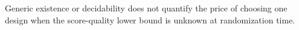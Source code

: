 Generic existence or decidability does not quantify the price of choosing one design when the score-quality lower bound is unknown at randomization time.